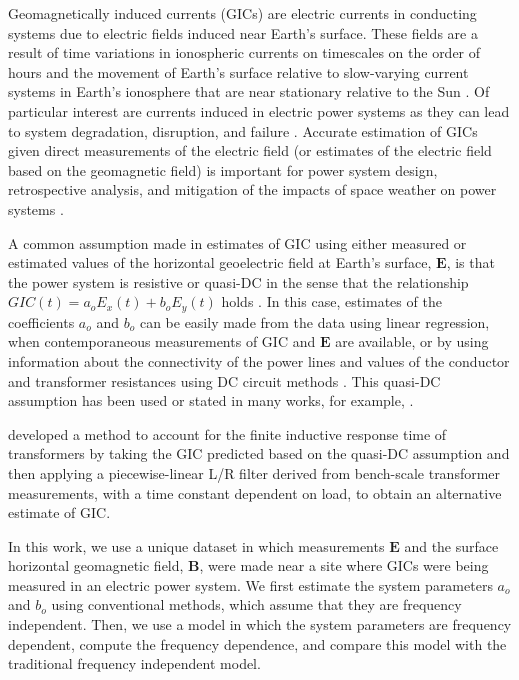 \documentclass[draft,linenumbers]{agujournal2018}
\begin{document}
Geomagnetically induced currents (GICs) are electric currents in conducting systems due to electric fields induced near Earth's surface. These fields are a result of time variations in ionospheric currents on timescales on the order of hours \citep{Ohtani2000} and the movement of Earth's surface relative to slow-varying current systems in Earth's ionosphere that are near stationary relative to the Sun \citep{Stening2013}. Of particular interest are currents induced in electric power systems as they can lead to system degradation, disruption, and failure \citep{Albertson1993,NERC2012}. Accurate estimation of GICs given direct measurements of the electric field (or estimates of the electric field based on the geomagnetic field) is important for power system design, retrospective analysis, and mitigation of the impacts of space weather on power systems \citep{Molinski2002,Thomson2010,NERC2012,Gaunt2014}. 

A common assumption made in estimates of GIC using either measured or estimated values of the horizontal geoelectric field at Earth's surface, $\mathbf{E}$, is that the power system is resistive or quasi-DC in the sense that the relationship $GIC(t) = a_oE_x(t) + b_oE_y(t)$ holds \citep{Albertson1981,Lehtinen1985}. In this case, estimates of the coefficients $a_o$ and $b_o$ can be easily made from the data using linear regression, when contemporaneous measurements of GIC and $\mathbf{E}$ are available, or by using information about the connectivity of the power lines and values of the conductor and transformer resistances using DC circuit methods \citep[e.g.][]{Boteler2014a,Boteler2014b}. This quasi-DC assumption has been used or stated in many works, for example, \citet{Pulkkinen2007,Wik2008,Pulkkinen2010,Ngwira2011,Horton2012,Viljanen2012,Overbye2012,Marshall2013,Liu2014,Zheng2014,Watari2015,Bonner2017}. 

\cite{Oyedokun2013a} developed a method to account for the finite inductive response time of transformers by taking the GIC predicted based on the quasi-DC assumption and then applying a piecewise-linear L/R filter derived from bench-scale transformer measurements, with a time constant dependent on load, to obtain an alternative estimate of GIC. 


In this work, we use a unique dataset in which measurements $\mathbf{E}$ and the surface horizontal geomagnetic field, $\mathbf{B}$, were made near a site where GICs were being measured in an electric power system.  We first estimate the system parameters $a_o$ and $b_o$ using conventional methods, which assume that they are frequency independent.  Then, we use a model in which the system parameters are frequency dependent, compute the frequency dependence, and compare this model with the traditional frequency independent model. 
\end{document}
